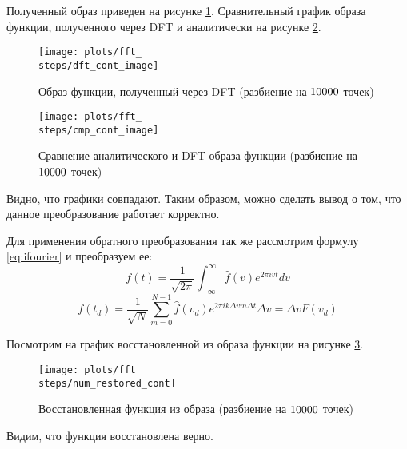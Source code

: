 Полученный образ приведен на рисунке \ref{fig:\steps_dft_cont_image}. Сравнительный график образа функции, полученного через DFT и аналитически на рисунке \ref{fig:\steps_cmp_cont_image}.
\begin{figure}
    \centering
    \texttt{[image: plots/fft\_\\steps/dft\_cont\_image]}
    \caption{Образ функции, полученный через DFT (разбиение на $10000$ точек)}
    \label{fig:\steps_dft_cont_image}
\end{figure}
\begin{figure}
    \centering
    \texttt{[image: plots/fft\_\\steps/cmp\_cont\_image]}
    \caption{Сравнение аналитического и DFT образа функции (разбиение на $10000$ точек)}
    \label{fig:\steps_cmp_cont_image}
\end{figure}

Видно, что графики совпадают. Таким образом, можно сделать вывод о том, что данное преобразование работает корректно. 

Для применения обратного преобразования так же рассмотрим формулу \eqref{eq:ifourier} и преобразуем ее:
\begin{equation}
    f(t) = \frac{1}{\sqrt{2\pi}}\int_{-\infty}^{\infty} \hat{f}(v) e^{2\pi i v t} dv 
    \label{eq:ifourier}
\end{equation}
\begin{equation}
    f(t_d) = \frac{1}{\sqrt{N}} \sum_{m = 0}^{N - 1} \hat{f}(v_d) e^{2\pi i k\Delta v m\Delta t } \Delta v = \Delta v F(v_d) 
\end{equation}

Посмотрим на график восстановленной из образа функции на рисунке \ref{fig:\steps_num_restored_cont}.
\begin{figure}[ht!]
    \centering
    \texttt{[image: plots/fft\_\\steps/num\_restored\_cont]}
    \caption{Восстановленная функция из образа (разбиение на $10000$ точек)}
    \label{fig:\steps_num_restored_cont}
\end{figure}

Видим, что функция восстановлена верно.
